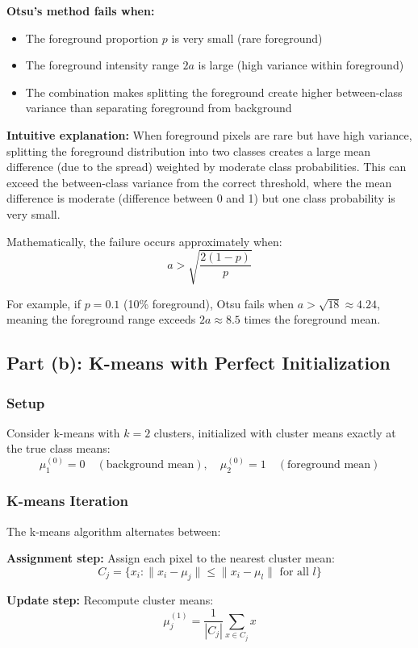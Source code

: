 \documentclass[11pt,a4paper]{article}
\begin{document}
\textbf{Otsu's method fails when:}
\begin{itemize}
    \item The foreground proportion $p$ is very small (rare foreground)
    \item The foreground intensity range $2a$ is large (high variance within foreground)
    \item The combination makes splitting the foreground create higher between-class variance than separating foreground from background
\end{itemize}

\textbf{Intuitive explanation:} When foreground pixels are rare but have high variance, splitting the foreground distribution into two classes creates a large mean difference (due to the spread) weighted by moderate class probabilities. This can exceed the between-class variance from the correct threshold, where the mean difference is moderate (difference between 0 and 1) but one class probability is very small.

Mathematically, the failure occurs approximately when:
$$a > \sqrt{\frac{2(1-p)}{p}}$$

For example, if $p = 0.1$ (10\% foreground), Otsu fails when $a > \sqrt{18} \approx 4.24$, meaning the foreground range exceeds $2a \approx 8.5$ times the foreground mean.

\subsection{Part (b): K-means with Perfect Initialization}

\subsubsection{Setup}
Consider k-means with $k = 2$ clusters, initialized with cluster means exactly at the true class means:
$$\mu_1^{(0)} = 0 \quad (\text{background mean}), \quad \mu_2^{(0)} = 1 \quad (\text{foreground mean})$$

\subsubsection{K-means Iteration}
The k-means algorithm alternates between:

\textbf{Assignment step:} Assign each pixel to the nearest cluster mean:
$$C_j = \{x_i : \|x_i - \mu_j\| \leq \|x_i - \mu_l\| \text{ for all } l\}$$

\textbf{Update step:} Recompute cluster means:
$$\mu_j^{(1)} = \frac{1}{|C_j|} \sum_{x \in C_j} x$$
\end{document}
